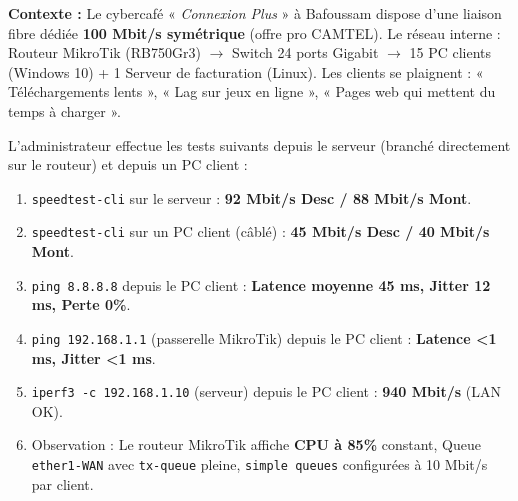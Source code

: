 \documentclass[11pt]{article}
\begin{document}
\begin{exoresolu}
\textbf{Contexte :} Le cybercafé « \textit{Connexion Plus} » à Bafoussam dispose d'une liaison fibre dédiée \textbf{100 Mbit/s symétrique} (offre pro CAMTEL). Le réseau interne : Routeur MikroTik (RB750Gr3) $\to$ Switch 24 ports Gigabit $\to$ 15 PC clients (Windows 10) + 1 Serveur de facturation (Linux). Les clients se plaignent : « Téléchargements lents », « Lag sur jeux en ligne », « Pages web qui mettent du temps à charger ».

L'administrateur effectue les tests suivants depuis le serveur (branché directement sur le routeur) et depuis un PC client :
\begin{enumerate}
    \item \texttt{speedtest-cli} sur le serveur : \textbf{92 Mbit/s Desc / 88 Mbit/s Mont}.
    \item \texttt{speedtest-cli} sur un PC client (câblé) : \textbf{45 Mbit/s Desc / 40 Mbit/s Mont}.
    \item \texttt{ping 8.8.8.8} depuis le PC client : \textbf{Latence moyenne 45 ms, Jitter 12 ms, Perte 0\%}.
    \item \texttt{ping 192.168.1.1} (passerelle MikroTik) depuis le PC client : \textbf{Latence <1 ms, Jitter <1 ms}.
    \item \texttt{iperf3 -c 192.168.1.10} (serveur) depuis le PC client : \textbf{940 Mbit/s} (LAN OK).
    \item Observation : Le routeur MikroTik affiche \textbf{CPU à 85\%} constant, Queue \texttt{ether1-WAN} avec \texttt{tx-queue} pleine, \texttt{simple queues} configurées à 10 Mbit/s par client.
\end{enumerate}


\end{exoresolu}
\end{document}
